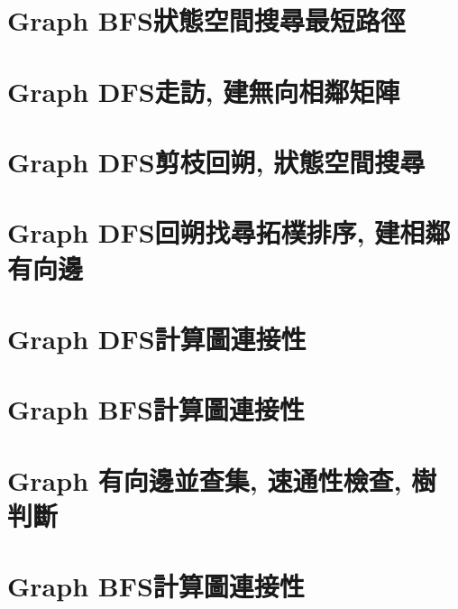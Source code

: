 \documentclass{article}
\begin{document}
\begin{multicols}{2}
\section{Graph BFS狀態空間搜尋最短路徑}



\section{Graph DFS走訪, 建無向相鄰矩陣}



\section{Graph DFS剪枝回朔, 狀態空間搜尋}



\section{Graph DFS回朔找尋拓樸排序, 建相鄰有向邊}



\section{Graph DFS計算圖連接性}



\section{Graph BFS計算圖連接性}



\section{Graph 有向邊並查集, 速通性檢查, 樹判斷}



\section{Graph BFS計算圖連接性}



\end{multicols}
\end{document}
